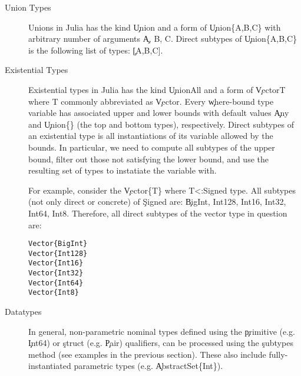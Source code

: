%


\begin{description}

  \item[Union Types]
        Unions in Julia has the kind \c{Union} and a form of \c{Union\{A,B,C\}}
        with arbitrary number of arguments \c{A, B, C}.
        Direct subtypes of \c{Union\{A,B,C\}} is the following list of types: \c{[A,B,C]}.

  \item[Existential Types]
        Existential types in Julia has the kind \c{UnionAll} and a form of
        \c{Vector{T} where T} commonly abbreviated as \c{Vector}. Every
        \c{where}-bound type variable has associated upper and lower bounds with
        default values \c{Any} and \c{Union\{\}} (the top and bottom types),
        respectively. Direct subtypes of an existential type is all
        instantiations of its variable allowed by the bounds. In particular, we
        need to compute all subtypes of the upper bound, filter out those not
        satisfying the lower bound, and use the resulting set of types to
        instatiate the variable with.

        For example, consider the \c{Vector\{T\} where T<:Signed} type.
        All subtypes (not only direct or concrete) of \c{Signed} are: \c{BigInt, Int128, Int16, Int32, Int64, Int8}. Therefore, all direct subtypes of the vector type in question are:

\begin{minipage}{.92\textwidth}
        \begin{lstlisting}
Vector{BigInt}
Vector{Int128}
Vector{Int16}
Vector{Int32}
Vector{Int64}
Vector{Int8}
        \end{lstlisting}
\end{minipage}

  \item[Datatypes]
        In general, non-parametric nominal types defined using the \c{primitive} (e.g. \c{Int64}) or
        \c{struct} (e.g. \c{Pair}) qualifiers,  can be processed
        using the \c{subtypes} method (see examples in the previous section).%
        These also include fully-instantiated parametric types
        (e.g. \c{AbstractSet\{Int\}}).


\end{description}
